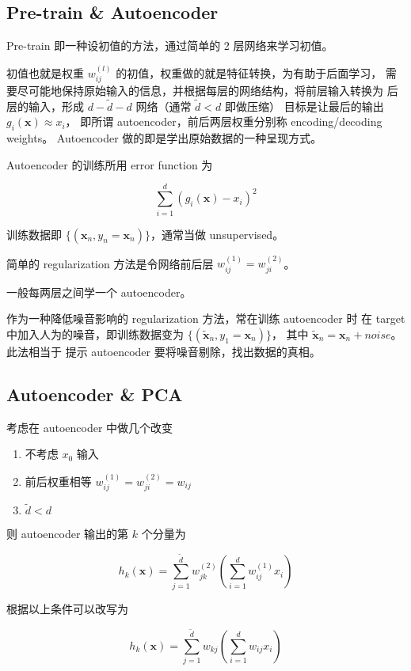 \documentclass[a4paper]{article}
\begin{document}
\subsection{Pre-train \& Autoencoder}
Pre-train 即一种设初值的方法，通过简单的 2 层网络来学习初值。

初值也就是权重 $w_{ij}^{(l)}$ 的初值，权重做的就是特征转换，为有助于后面学习，
需要尽可能地保持原始输入的信息，并根据每层的网络结构，将前层输入转换为
后层的输入，形成 $d-\tilde{d}-d$ 网络（通常 $\tilde{d} < d$ 即做压缩）
目标是让最后的输出 $g_i(\mathbf{x}) \approx x_i$，
即所谓 autoencoder，前后两层权重分别称 encoding/decoding weights。
Autoencoder 做的即是学出原始数据的一种呈现方式。

Autoencoder 的训练所用 error function 为

$$\sum_{i=1}^{d}(g_i(\mathbf{x}) - x_i)^2$$

训练数据即 $\{(\mathbf{x}_n, y_n = \mathbf{x}_n)\}$，通常当做 unsupervised。

简单的 regularization 方法是令网络前后层 $w_{ij}^{(1)} = w_{ji}^{(2)}$。

一般每两层之间学一个 autoencoder。

作为一种降低噪音影响的 regularization 方法，常在训练 autoencoder 时
在 target 中加入人为的噪音，即训练数据变为 $\{(\tilde{\mathbf{x}}_n, y_1=\mathbf{x}_n)\}$，
其中 $\tilde{\mathbf{x}}_n = \mathbf{x}_n + noise$。此法相当于
提示 autoencoder 要将噪音剔除，找出数据的真相。


\subsection{Autoencoder \& PCA}
考虑在 autoencoder 中做几个改变
\begin{enumerate}
  \item 不考虑 $x_0$ 输入\\
  \item 前后权重相等 $w_{ij}^{(1)} = w_{ji}^{(2)} = w_{ij}$\\
  \item $\tilde{d} < d$\\
\end{enumerate}

则 autoencoder 输出的第 $k$ 个分量为

$$h_k(\mathbf{x}) = \sum_{j=1}^{\tilde{d}}w_{jk}^{(2)}\left ( \sum_{i=1}^{d}w_{ij}^{(1)}x_i \right )$$

根据以上条件可以改写为

$$h_k(\mathbf{x}) = \sum_{j=1}^{\tilde{d}}w_{kj}\left ( \sum_{i=1}^{d}w_{ij}x_i \right )$$
\end{document}

